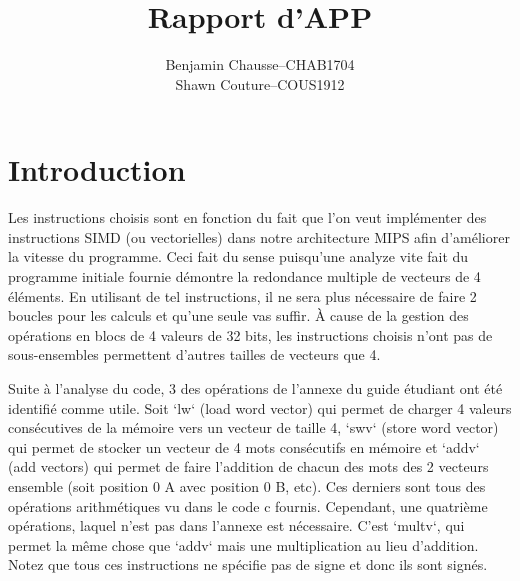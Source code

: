 \documentclass[a11paper]{article}
\title{Rapport d'APP}
\author{
  \addtolength{\tabcolsep}{-0.4em}
  \begin{tabular}{rcl} %
      Benjamin Chausse & -- & CHAB1704 \\
      Shawn Couture    & -- & COUS1912 \\
  \end{tabular}
}
\begin{document}
\maketitle
\newpage
\tableofcontents
\newpage

\section{Introduction}
Les instructions choisis sont en fonction du fait que l'on veut implémenter des instructions SIMD (ou vectorielles) dans notre architecture MIPS afin d'améliorer
la vitesse du programme. Ceci fait du sense puisqu'une analyze vite fait du programme initiale fournie démontre la redondance multiple de vecteurs de 4 éléments.
En utilisant de tel instructions, il ne sera plus nécessaire de faire 2 boucles pour les calculs et qu'une seule vas suffir. À cause de la gestion des opérations en blocs de 4 valeurs de 32 bits, les instructions choisis n'ont pas de sous-ensembles permettent d'autres tailles de vecteurs que 4.

Suite à l'analyse du code, 3 des opérations de l'annexe du guide étudiant ont été identifié comme utile. Soit `lw` (load word vector) qui permet de charger 4 valeurs consécutives de la mémoire vers un vecteur de taille 4, `swv` (store word vector) qui permet de stocker un vecteur de 4 mots consécutifs en mémoire et `addv` (add vectors) qui permet de faire l'addition de chacun des mots des 2 vecteurs ensemble (soit position 0 A avec position 0 B, etc). Ces derniers sont tous des opérations arithmétiques vu dans le code c fournis. Cependant, une quatrième opérations, laquel n'est pas dans l'annexe est nécessaire. C'est `multv`, qui permet la même chose que `addv` mais une multiplication au lieu d'addition. Notez que tous ces instructions ne spécifie pas de signe et donc ils sont signés.
\end{document}

